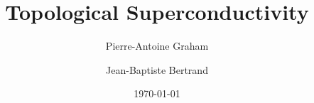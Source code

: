 




\title{Topological Superconductivity} 

\author{Pierre-Antoine Graham}
\author{Jean-Baptiste Bertrand}


\date{\today}

\begin{abstract}

\end{abstract}

\maketitle

\tableofcontents

\listoffigures

